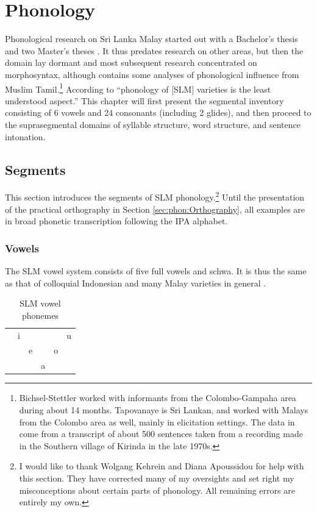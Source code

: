 
\chapter{Phonology}
\glossSTDmode
Phonological research on Sri Lanka Malay started out with a Bachelor's thesis \citep{Tapovanaye1986} and two Master's theses    \citep{Bichsel, Tapovanaye1995}. It thus predates research on other areas, but then the domain lay dormant and most subsequent research concentrated on morphosyntax, although \citet{SmithEtAl2004} contains some analyses of phonological influence from Muslim Tamil.\footnote{Bichsel-Stettler worked with informants  from the Colombo-Gampaha area during about 14 months. Tapovanaye is Sri Lankan, and worked with Malays from the Colombo area as well, mainly in elicitation settings. The data in \citet{SmithEtAl2004} come from a transcript of about 500 sentences taken from a recording  made in the Southern village of Kirinda in the late 1970s.} According to \citet{Ansaldo2005ms} ``phonology of [SLM] varieties is the least understood aspect.''
This chapter will first present the segmental inventory consisting of 6 vowels and 24 consonants (including 2 glides), and then proceed to the suprasegmental domains of syllable structure, word structure, and sentence intonation.


\section{Segments}\label{sec:phon:Segments}
\glossIPAmode
This section  introduces the segments of SLM phonology.\footnote{I would like to thank Wolgang Kehrein and Diana Apoussidou for help with this section. They have corrected many of my oversights and set right my misconceptions about certain parts of phonology. All remaining errors are entirely my own.}
 Until the presentation of the practical orthography in Section \ref{sec:phon:Orthography}, all examples are in broad phonetic transcription following the IPA alphabet.

\subsection{Vowels}\label{sec:phon:Vowels}
The SLM vowel system consists of five full vowels and schwa. It is thus the same as that of colloquial Indonesian \citep[229]{Ewing2005} and many Malay varieties in general \citep{Adelaar1985,Adelaar2005struct}. 

\begin{table}[!h]
    \centering
        \begin{tabular}{rccccc}
                &  i    &  	 &        	 &  		 &   u   \\
                &       &  e &  \textipa{@}       &  o &      \\
                &       &   &    a   &   &      \\
        \end{tabular}
    \caption{SLM vowel phonemes}
    \label{tab:SLMVowelPhonemcdes}
\end{table}

